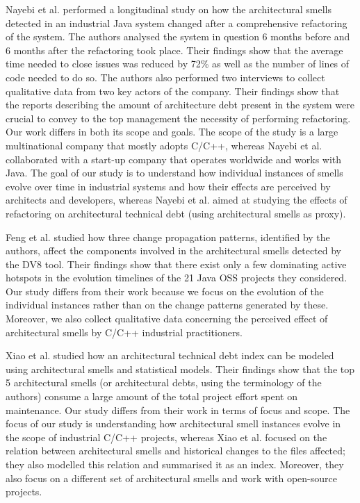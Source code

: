 Nayebi et al. \cite{Nayebi2019} performed a longitudinal study on how the architectural smells detected in an industrial Java system changed after a comprehensive refactoring of the system. 
The authors analysed the system in question 6 months before and 6 months after the refactoring took place.
Their findings show that the average time needed to close issues was reduced by 72\% as well as the number of lines of code needed to do so.
The authors also performed two interviews to collect qualitative data from two key actors of the company.
Their findings show that the reports describing the amount of architecture debt present in the system were crucial to convey to the top management the necessity of performing refactoring.
Our work differs in both its scope and goals.
The scope of the study is a large multinational company that mostly adopts C/C++, whereas Nayebi et al. collaborated with a start-up company that operates worldwide and works with Java.
The goal of our study is to understand how individual instances of smells evolve over time in industrial systems and how their effects are perceived by architects and developers, whereas Nayebi et al. aimed at studying the effects of refactoring on architectural technical debt (using architectural smells as proxy).

Feng et al. \cite{Feng2019} studied how three change propagation patterns, identified by the authors, affect the components involved in the architectural smells detected by the DV8 tool. 
Their findings show that there exist only a few dominating active hotspots in the evolution timelines of the 21 Java OSS projects they considered.
Our study differs from their work because we focus on the evolution of the individual instances rather than on the change patterns generated by these.
Moreover, we also collect qualitative data concerning the perceived effect of architectural smells by C/C++ industrial practitioners.

Xiao et al. \cite{Xiao2016} studied how an architectural technical debt index can be modeled using architectural smells and statistical models. Their findings show that the top 5 architectural smells (or architectural debts, using the terminology of the authors) consume a large amount of the total project effort spent on maintenance.
Our study differs from their work in terms of focus and scope. 
The focus of our study is understanding how architectural smell instances evolve in the scope of industrial C/C++ projects, whereas Xiao et al. focused on the relation between architectural smells and historical changes to the files affected; they also modelled this relation and summarised it as an index.
Moreover, they also focus on a different set of architectural smells and work with open-source projects.

